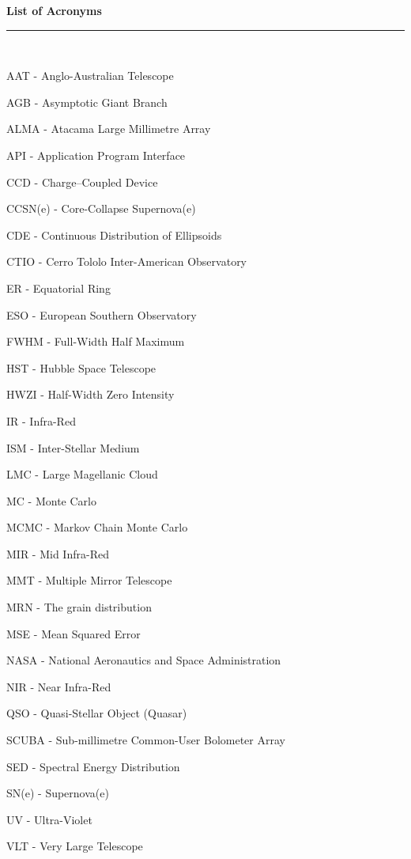 \thispagestyle{empty}
\begin{raggedleft}
\vspace*{23mm}
\hfill {\huge {\bf {List of Acronyms}}} \\
\vspace{6mm}
\hfill \rule{4in}{.015in} \\
\vspace{19mm}
\end{raggedleft}




%
%

AAT - Anglo-Australian Telescope

AGB - Asymptotic Giant Branch

ALMA - Atacama Large Millimetre Array

API - Application Program Interface

CCD - Charge--Coupled Device

CCSN(e) - Core-Collapse Supernova(e)

CDE - Continuous Distribution of Ellipsoids

CTIO - Cerro Tololo Inter-American Observatory

ER - Equatorial Ring

ESO - European Southern Observatory

FWHM - Full-Width Half Maximum

HST - Hubble Space Telescope

HWZI - Half-Width Zero Intensity

IR - Infra-Red

ISM - Inter-Stellar Medium

LMC - Large Magellanic Cloud

MC - Monte Carlo

MCMC - Markov Chain Monte Carlo

MIR - Mid Infra-Red 

MMT - Multiple Mirror Telescope

MRN - The \citet*{Mathis1977} grain distribution

MSE - Mean Squared Error

NASA - National Aeronautics and Space Administration

NIR - Near Infra-Red

QSO - Quasi-Stellar Object (Quasar)

SCUBA - Sub-millimetre Common-User Bolometer Array

SED - Spectral Energy Distribution

SN(e) - Supernova(e)

UV - Ultra-Violet

VLT - Very Large Telescope
